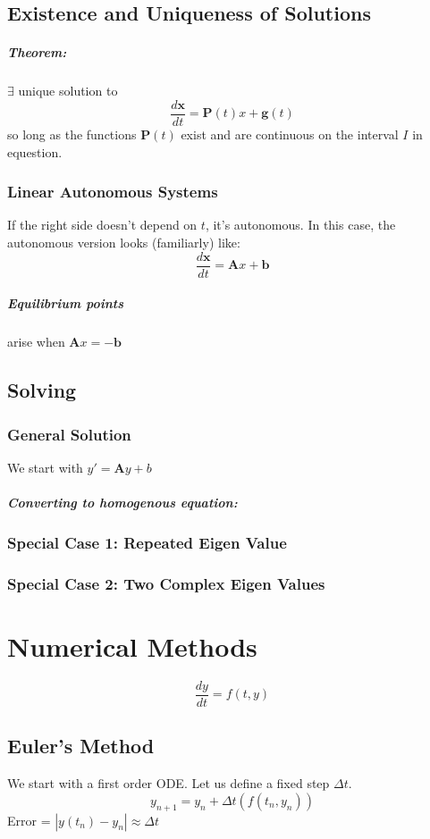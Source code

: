 \documentclass[a4paper,12pt]{report}
\begin{document}
\section{Existence and Uniqueness of Solutions}
\paragraph{Theorem: } $\exists$ unique solution to $$\frac{d\pmb{x}}{dt} = \pmb{P}(t)x + \pmb{g}(t)$$ 
so long as the functions $\pmb{P}(t)$ exist and are continuous on the interval $I$ in equestion.

\subsection{Linear Autonomous Systems}
If the right side doesn't depend on $t$, it's autonomous. In this case, the autonomous 
version looks (familiarly) like: $$\frac{d\pmb{x}}{dt} = \pmb{A}x + \pmb{b}$$

\paragraph{Equilibrium points} arise when $\pmb{A}x = -\pmb{b}$

\section{Solving}
\subsection{General Solution}
We start with $y' = \pmb{A}y+b$
\paragraph{Converting to homogenous equation: } 
\subsection{Special Case 1: Repeated Eigen Value}
\subsection{Special Case 2: Two Complex Eigen Values}

\chapter{Numerical Methods}
$$\frac{dy}{dt} = f(t, y)$$
\section{Euler's Method}
We start with a first order ODE. Let us define a fixed step $\Delta t$.
$$y_{n+1} = y_n + \Delta t(f(t_n, y_n))$$
Error = $|y(t_n)-y_n| \approx \Delta t$
\end{document}
